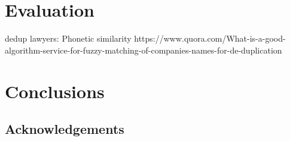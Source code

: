 



\section{Evaluation}

dedup lawyers: Phonetic similarity
https://www.quora.com/What-is-a-good-algorithm-service-for-fuzzy-matching-of-companies-names-for-de-duplication


\section{Conclusions}
\subsection{Acknowledgements}

